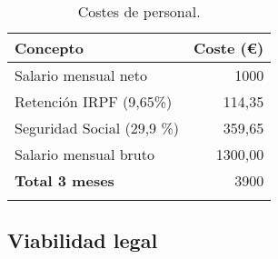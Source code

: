 \begin{longtable}[]{@{}lr@{}}
\toprule
\begin{minipage}[b]{0.38\columnwidth}\raggedright\strut
\textbf{Concepto}\strut
\end{minipage} & \begin{minipage}[b]{0.20\columnwidth}\raggedleft\strut
\textbf{Coste (\euro{}) }\strut
\end{minipage}\tabularnewline
\midrule
\endhead

\begin{minipage}[t]{0.38\columnwidth}\raggedright\strut
Salario mensual neto\strut
\end{minipage} & \begin{minipage}[t]{0.20\columnwidth}\raggedleft\strut
{1000}\strut
\end{minipage}\tabularnewline

\begin{minipage}[t]{0.38\columnwidth}\raggedright\strut
Retención IRPF (9,65\%)\strut
\end{minipage} & \begin{minipage}[t]{0.20\columnwidth}\raggedleft\strut
114,35\strut
\end{minipage}\tabularnewline

\begin{minipage}[t]{0.38\columnwidth}\raggedright\strut
Seguridad Social (29,9 \%)\strut
\end{minipage} & \begin{minipage}[t]{0.20\columnwidth}\raggedleft\strut
359,65\strut
\end{minipage}\tabularnewline

\begin{minipage}[t]{0.38\columnwidth}\raggedright\strut
Salario mensual bruto\strut
\end{minipage} & \begin{minipage}[t]{0.20\columnwidth}\raggedleft\strut
1300,00\strut
\end{minipage}\tabularnewline

\midrule
\begin{minipage}[t]{0.38\columnwidth}\raggedright\strut
\textbf{Total 3 meses}\strut
\end{minipage} & \begin{minipage}[t]{0.20\columnwidth}\raggedleft\strut
3900\strut
\end{minipage}\tabularnewline
\bottomrule
\caption{Costes de personal.}
\end{longtable}


\subsection{Viabilidad legal}


